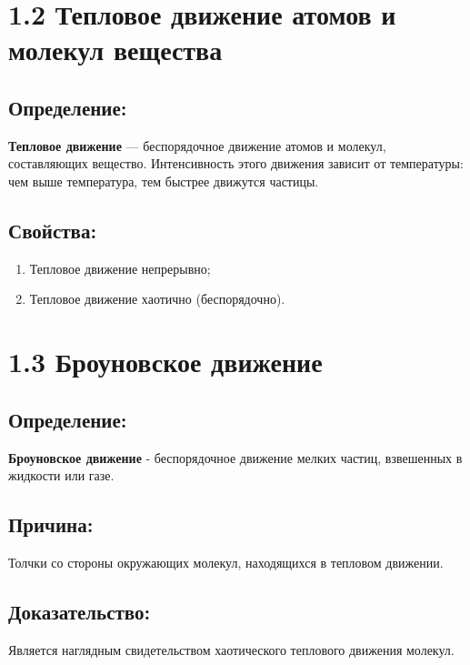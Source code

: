 \documentclass[a4paper,12pt]{article}
\begin{document}
\section*{1.2 Тепловое движение атомов и молекул вещества}

\vspace{-9pt}
\subsection*{Определение:}
\vspace{-3pt}
\textbf{Тепловое движение} --- беспорядочное движение атомов и молекул, составляющих вещество. Интенсивность этого движения зависит от температуры: чем выше температура, тем быстрее движутся частицы.

\vspace{-9pt}
\subsection*{Свойства:}
\vspace{-3pt}
\begin{enumerate}[itemsep=0pt, topsep=0pt, parsep=0pt]
  \item Тепловое движение непрерывно;
  \item Тепловое движение хаотично (беспорядочно).
\end{enumerate}


\section*{1.3 Броуновское движение}

\vspace{-9pt}
\subsection*{Определение:}
\vspace{-3pt}
\textbf{Броуновское движение} - беспорядочное движение мелких частиц, взвешенных в жидкости или газе.

\vspace{-9pt}
\subsection*{Причина:}
\vspace{-3pt}
Толчки со стороны окружающих молекул, находящихся в тепловом движении.

\vspace{-9pt}
\subsection*{Доказательство:}
\vspace{-3pt}
Является наглядным свидетельством хаотического теплового движения молекул.
\end{document}
